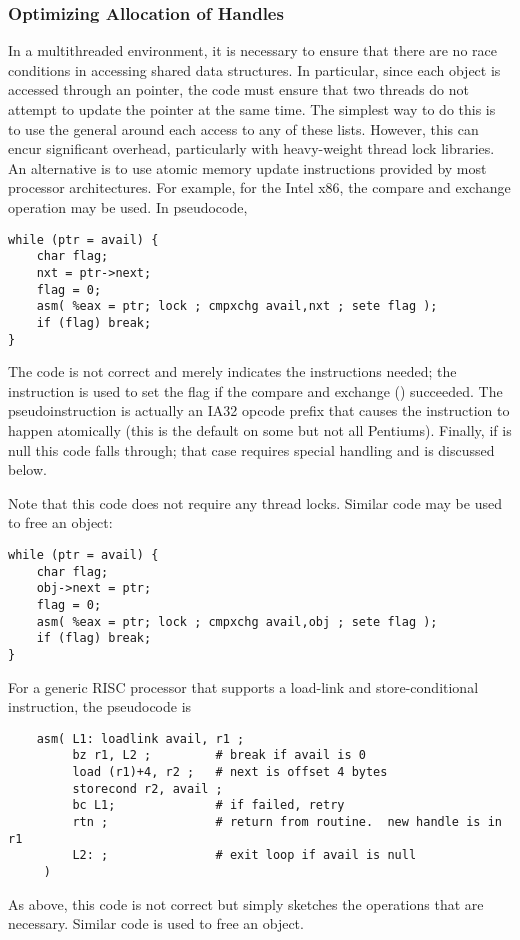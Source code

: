 \documentclass{article}
\begin{document}
\subsubsection{Optimizing Allocation of Handles}
\label{sec:optimizing-handle-alloc}
In a multithreaded environment, it is necessary to ensure that there are no
race conditions in accessing shared data structures.  In particular, since
each object is accessed through an  pointer, the code must ensure
that two threads do not attempt to update the  pointer at the same
time.  The simplest way to do this is to use the general
 around each access to any of these
lists.  However, this can encur significant overhead, particularly with
heavy-weight thread lock libraries.  An alternative is to use atomic memory
update instructions provided by most processor architectures.  For example,
for the Intel x86, the compare and exchange operation may be used.  In
pseudocode, 
\begin{verbatim}
while (ptr = avail) {
    char flag;
    nxt = ptr->next; 
    flag = 0;
    asm( %eax = ptr; lock ; cmpxchg avail,nxt ; sete flag );
    if (flag) break;
}
\end{verbatim}
The  code is not correct and merely indicates the instructions
needed; the  instruction is used to set the flag if the compare and
exchange () succeeded.  The pseudoinstruction  is
actually an IA32 opcode prefix that causes the 
instruction to happen 
atomically (this is the default on some but not all Pentiums).  Finally,
if  is null this code falls through; that case requires special
handling and is discussed below.

Note that this code does not require any thread locks.  Similar code may be
used to free an object:
\begin{verbatim}
while (ptr = avail) {
    char flag;
    obj->next = ptr;
    flag = 0;
    asm( %eax = ptr; lock ; cmpxchg avail,obj ; sete flag );
    if (flag) break;
}
\end{verbatim}

For a generic RISC processor that supports a load-link and store-conditional
instruction, the pseudocode is
\begin{verbatim}
    asm( L1: loadlink avail, r1 ;
         bz r1, L2 ;         # break if avail is 0
         load (r1)+4, r2 ;   # next is offset 4 bytes
         storecond r2, avail ;
         bc L1;              # if failed, retry
         rtn ;               # return from routine.  new handle is in r1
         L2: ;               # exit loop if avail is null
     )
\end{verbatim}
As above, this  code is not correct but simply sketches the
operations that are necessary.  Similar code is used to free an object.
\end{document}

